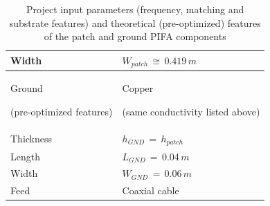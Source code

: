 \documentclass[12pt,a4paper]{article}
\begin{document}
{\begin{table}[h]
\begin{center}
{\begin{tabular}{||m{5cm}|m{5cm}||}
Width & $W_{patch}\,\cong\,0.419\,m$\\

	\hline
\cellcolor{pink}Ground 

(pre-optimized features)
& \cellcolor{pink} Copper

(same conductivity listed above) \\
\hline
Thickness & $h_{GND}\,=\,h_{patch}$
\\
Length & $L_{GND}\,=\,0.04\,m$\\
Width & $W_{GND}\,=\,0.06\,m$\\
\hline
\cellcolor{pink}Feed & \cellcolor{pink} Coaxial cable \\
\hline
\end{tabular}}
\caption{Project input parameters (frequency, matching and substrate features) and theoretical (pre-optimized) features of the patch and ground PIFA components}
\label{table:pifa design parameters}
\end{center}

\end{table}

}
\end{document}
